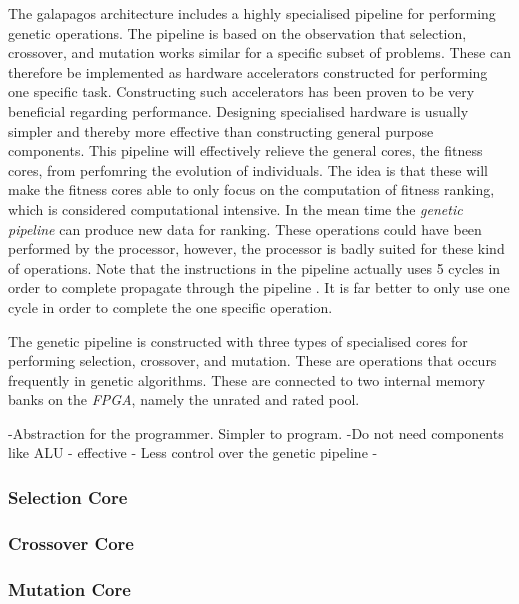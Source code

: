 The galapagos architecture includes a highly specialised pipeline for performing genetic operations. The pipeline is based on the observation that selection, crossover, and mutation works similar for a specific subset of problems. These can therefore be implemented as hardware accelerators constructed for performing one specific task. Constructing such accelerators has been proven to be very beneficial regarding performance.  Designing specialised hardware is usually simpler and thereby more effective than constructing general purpose components. This pipeline will effectively relieve the general cores, the fitness cores, from perfomring the evolution of individuals. The idea is that these will make the fitness cores able to only focus on the computation of fitness ranking, which is considered computational intensive. In the mean time the \emph{genetic pipeline} can produce new data for ranking. These operations could have been performed by the processor, however, the processor is badly suited for these kind of operations. Note that the instructions in the pipeline actually uses 5 cycles in order to complete  propagate through the pipeline . It is far better to only use one cycle in order to complete the one specific operation.  

The genetic pipeline is constructed with three types of specialised cores for performing selection, crossover, and mutation. These are operations that occurs frequently in genetic algorithms. These are connected to two internal memory banks on the \emph{FPGA}, namely the unrated and rated pool.


-Abstraction for the programmer. Simpler to program.
-Do not need components like ALU
- effective 
- Less control over the genetic pipeline
- 


\subsubsection {Selection Core} \label{fpga:selection:ss:selection_core}
     \label{fpga:subsection:selection_core}

\subsubsection{Crossover Core} \label{fpga:crossover:ss:crossover_core}
     \label{fpga:subsection:crossover_core}

\subsubsection{Mutation Core}\label{fpga:mutation:ss:mutation_core}
     \label{fpga:subsection:mutation_core}


